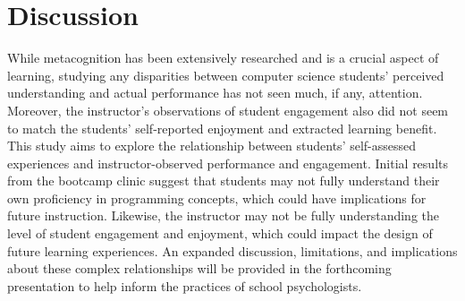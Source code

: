 \documentclass[12pt]{article}
\begin{document}
\section{Discussion}
While metacognition has been extensively researched and is a crucial aspect of
learning, studying any disparities between computer science students' perceived
understanding and actual performance has not seen much, if any, attention.
Moreover, the instructor's observations of student engagement also did not seem
to match the students' self-reported enjoyment and extracted learning benefit.
This study aims to explore the relationship between students' self-assessed
experiences and instructor-observed performance and engagement.  Initial results
from the bootcamp clinic suggest that students may not fully understand their own
proficiency in programming concepts, which could have implications for future
instruction.  Likewise, the instructor may not be fully understanding the level
of student engagement and enjoyment, which could impact the design of future
learning experiences.  An expanded discussion, limitations, and implications
about these complex relationships will be provided in the forthcoming
presentation to help inform the practices of school psychologists.

\printbibliography
\end{document}
